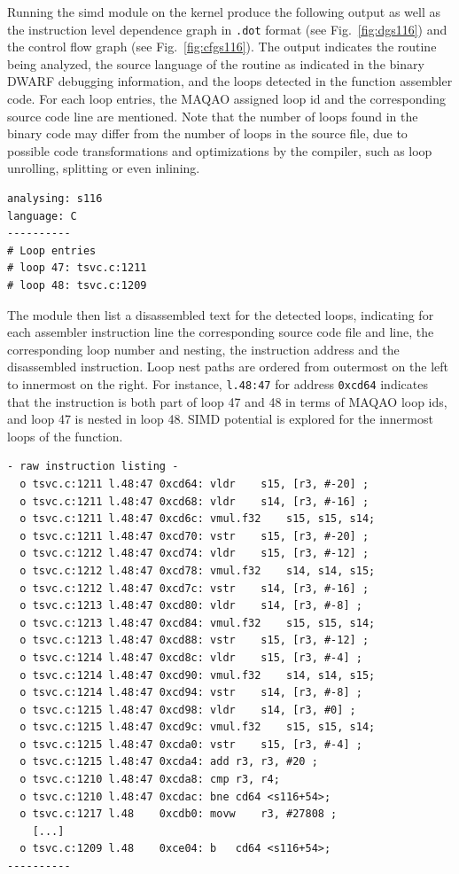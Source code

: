 \documentclass[11pt, a4paper, twoside]{montblanc2}
\begin{document}
Running the simd module on the kernel produce the following output as well as
the instruction level dependence graph in \texttt{.dot} format (see
Fig.~\ref{fig:dgs116}) and the control flow graph (see Fig.~\ref{fig:cfgs116}). 
The output indicates the routine being analyzed, the
source language of the routine as indicated in the binary DWARF debugging
information, and the loops detected in the function assembler code. For each
loop entries, the MAQAO assigned loop id and the corresponding source code line
are mentioned. Note that the number of loops found in the binary code may differ
from the number of loops in the source file, due to possible code
transformations and optimizations by the compiler, such as loop unrolling,
splitting or even inlining. 

\begin{small}
\begin{verbatim}
analysing: s116
language: C
----------
# Loop entries
# loop 47: tsvc.c:1211
# loop 48: tsvc.c:1209
\end{verbatim}
\end{small}

The module then list a disassembled text for the detected loops, indicating for
each assembler instruction line the corresponding source code file and line, the
corresponding loop number and nesting, the instruction address and the
disassembled instruction. Loop nest paths are ordered from outermost on the left
to innermost on the right. For instance, \verb|l.48:47| for address
\texttt{0xcd64} indicates that the instruction is both part of loop 47 and 48
in terms of MAQAO loop ids, and loop 47 is nested in loop 48. SIMD potential is
explored for the innermost loops of the function.

\begin{small}
\begin{verbatim}
- raw instruction listing -
  o tsvc.c:1211 l.48:47 0xcd64: vldr	s15, [r3, #-20] ;
  o tsvc.c:1211 l.48:47 0xcd68: vldr	s14, [r3, #-16] ;
  o tsvc.c:1211 l.48:47 0xcd6c: vmul.f32	s15, s15, s14;
  o tsvc.c:1211 l.48:47 0xcd70: vstr	s15, [r3, #-20] ;
  o tsvc.c:1212 l.48:47 0xcd74: vldr	s15, [r3, #-12] ;
  o tsvc.c:1212 l.48:47 0xcd78: vmul.f32	s14, s14, s15;
  o tsvc.c:1212 l.48:47 0xcd7c: vstr	s14, [r3, #-16] ;
  o tsvc.c:1213 l.48:47 0xcd80: vldr	s14, [r3, #-8] ;
  o tsvc.c:1213 l.48:47 0xcd84: vmul.f32	s15, s15, s14;
  o tsvc.c:1213 l.48:47 0xcd88: vstr	s15, [r3, #-12] ;
  o tsvc.c:1214 l.48:47 0xcd8c: vldr	s15, [r3, #-4] ;
  o tsvc.c:1214 l.48:47 0xcd90: vmul.f32	s14, s14, s15;
  o tsvc.c:1214 l.48:47 0xcd94: vstr	s14, [r3, #-8] ;
  o tsvc.c:1215 l.48:47 0xcd98: vldr	s14, [r3, #0] ;
  o tsvc.c:1215 l.48:47 0xcd9c: vmul.f32	s15, s15, s14;
  o tsvc.c:1215 l.48:47 0xcda0: vstr	s15, [r3, #-4] ;
  o tsvc.c:1215 l.48:47 0xcda4: add	r3, r3, #20 ;
  o tsvc.c:1210 l.48:47 0xcda8: cmp	r3, r4;
  o tsvc.c:1210 l.48:47 0xcdac: bne	cd64 <s116+54>;
  o tsvc.c:1217 l.48    0xcdb0: movw	r3, #27808 ;
    [...]
  o tsvc.c:1209 l.48    0xce04: b	cd64 <s116+54>;
----------
\end{verbatim}
\end{small}
\end{document}
